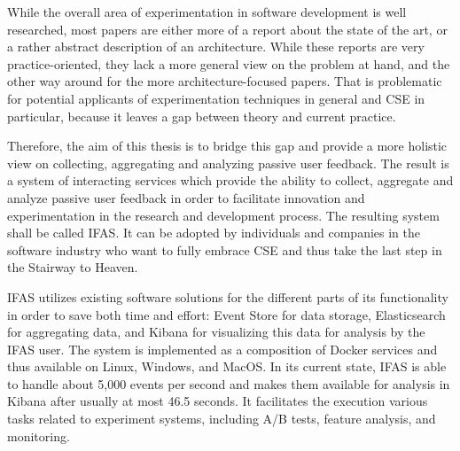 While the overall area of experimentation in software development is well researched, most papers are either more of a report about the state of the art, or a rather abstract description of an architecture.
While these reports are very practice-oriented, they lack a more general view on the problem at hand, and the other way around for the more architecture-focused papers.
That is problematic for potential applicants of experimentation techniques in general and \ac{CSE} in particular, because it leaves a gap between theory and current practice.

Therefore, the aim of this thesis is to bridge this gap and provide a more holistic view on collecting, aggregating and analyzing passive user feedback.
%
The result is a system of interacting services which provide the ability to collect, aggregate and analyze passive user feedback in order to facilitate innovation and experimentation in the research and development process.
The resulting system shall be called \ac{IFAS}.
It can be adopted by individuals and companies in the software industry who want to fully embrace \ac{CSE} and thus take the last step in the Stairway to Heaven.

\ac{IFAS} utilizes existing software solutions for the different parts of its functionality in order to save both time and effort:
Event Store for data storage, Elasticsearch for aggregating data, and Kibana for visualizing this data for analysis by the \ac{IFAS} user.
The system is implemented as a composition of Docker services and thus available on Linux, Windows, and MacOS.
In its current state, \ac{IFAS} is able to handle about 5,000 events per second and makes them available for analysis in Kibana after usually at most 46.5 seconds.
It facilitates the execution various tasks related to experiment systems, including A/B tests, feature analysis, and monitoring.


